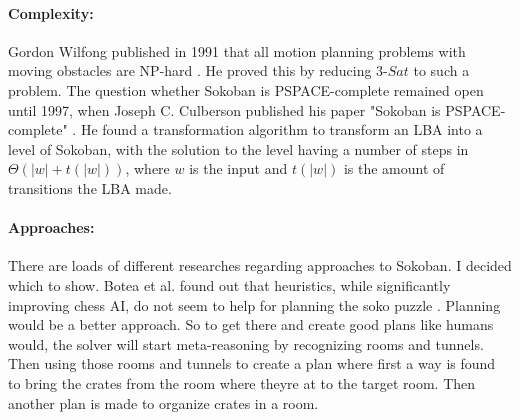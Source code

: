 \documentclass{report}
\begin{document}
\paragraph{Complexity:} Gordon Wilfong published in 1991 that all motion planning problems with moving obstacles are NP-hard \cite{WilfongNPhard}. He proved this by reducing $3$-$Sat$ to such a problem. The question whether Sokoban is PSPACE-complete remained open until 1997, when Joseph C. Culberson published his paper "Sokoban is PSPACE-complete" \cite{PSpaceComplete}. He found a transformation algorithm to transform an LBA into a level of Sokoban, with the solution to the level having a number of steps in $\Theta (|w|+t(|w|))$, where $w$ is the input and $t(|w|)$ is the amount of transitions the LBA made.
\paragraph{Approaches:} There are loads of different researches regarding approaches to Sokoban. I decided which to show. Botea et al. found out that heuristics, while significantly improving chess AI, do not seem to help for planning the soko puzzle \cite{BoteaHeuristicsVsPlanning}. Planning would be a better approach. So to get there and create good plans like humans would, the solver will start meta-reasoning by recognizing rooms and tunnels. Then using those rooms and tunnels to create a plan where first a way is found to bring the crates from the room where theyre at to the target room. Then another plan is made to organize crates in a room.
\end{document}
